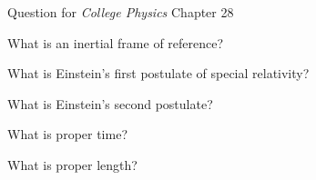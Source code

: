 \documentclass[addpoints,12pt]{exam}
\begin{document}
\noindent Question for \textit{College Physics} Chapter 28
\begin{questions}

\question[1]
What is an inertial frame of reference?
\fillwithlines{0.5in}

\question[1]
What is Einstein's first postulate of special relativity?
\fillwithlines{0.5in}

\question[1]
What is Einstein's second postulate?
\fillwithlines{0.5in}

\question[2]
What is proper time?
\fillwithlines{0.5in}

\question[2]
What is proper length?
\fillwithlines{0.5in}

\end{questions}
\end{document}
